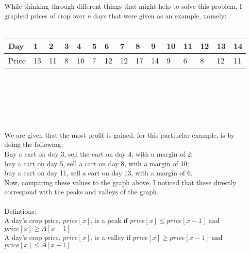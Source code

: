 \documentclass[11pt]{article}
\begin{document}
		While thinking through different things that might help to solve this problem, I graphed prices of crop over \textit{n} days that were given as an example, namely: \\
		\\
		\begin{tabu} to 1 \textwidth { | X[c] | X[c] | X[c] | X[c] | X[c] | X[c] | X[c] | X[c] | X[c] | X[c] | X[c] | X[c] | X[c] | X[c] | X[c] |}
			\hline
			Day & 1 & 2 & 3 & 4 & 5 & 6 & 7 & 8 & 9 & 10 & 11 & 12 & 13 & 14 \\
			\hline
			Price  & 13  & 11 & 8 & 10 & 7 & 12 & 12 & 17 & 14 & 9 & 6 & 8 & 12 & 11  \\
			\hline
		\end{tabu}\\
	\\
	\\
		 \\
		\\
		We are given that the most profit is gained, for this partiuclar example, is by doing the following:\\
		Buy a cart on day 3, sell the cart on day 4, with a margin of 2;\\
		buy a cart on day 5, sell a cart on day 8, with a margin of 10;\\
		buy a cart on day 11, sell a cart on day 13, with a margin of 6.\\
		Now, comparing these values to the graph above, I noticed that these directly correspond with the peaks and valleys of the graph. \\
		\\
		Defintions:\\
		A day's crop price, $price[x]$, is a peak if $price[x] \leq price[x-1]$ and $price[x] \geq A[x+1]$\\
		A day's crop price, $price[x]$, is a valley if $price[x] \geq price[x-1]$ and $price[x] \leq A[x+1]$\\
\end{document}
